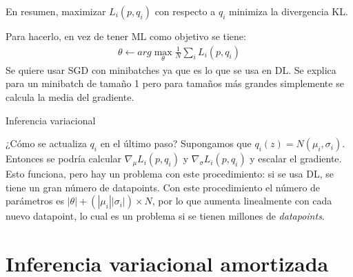En resumen, maximizar $L_i(p,q_i)$ con respecto a $q_i$ minimiza la divergencia KL.

Para hacerlo, en vez de tener ML como objetivo se tiene:
\begin{align}
    \theta \gets arg\max_\theta \frac{1}{N} \sum_i L_i(p,q_i)
\end{align}
Se quiere usar SGD con minibatches ya que es lo que se usa en DL. Se explica para un minibatch de
tamaño 1 pero para tamaños más grandes simplemente se calcula la media del gradiente.
\begin{algorithm}
    \caption{Inferencia variacional}
\end{algorithm}

¿Cómo se actualiza $q_i$ en el último paso? Supongamos que $q_i(z)=N(\mu_i,\sigma_i)$. Entonces
se podría calcular $\nabla_\mu L_i(p,q_i)$ y $\nabla_\sigma L_i(p,q_i)$ y escalar el
gradiente. Esto funciona, pero hay un problema con este procedimiento: si se usa DL, se tiene un
gran número de datapoints. Con este procedimiento el número de parámetros es
$|\theta|+(|\mu_i||\sigma_i|)\times N$, por lo que aumenta linealmente con cada nuevo
datapoint, lo cual es un problema si se tienen millones de \textit{datapoints}. 


\section{Inferencia variacional amortizada}%
\label{sec:inferencia_variacional_amortizada}

